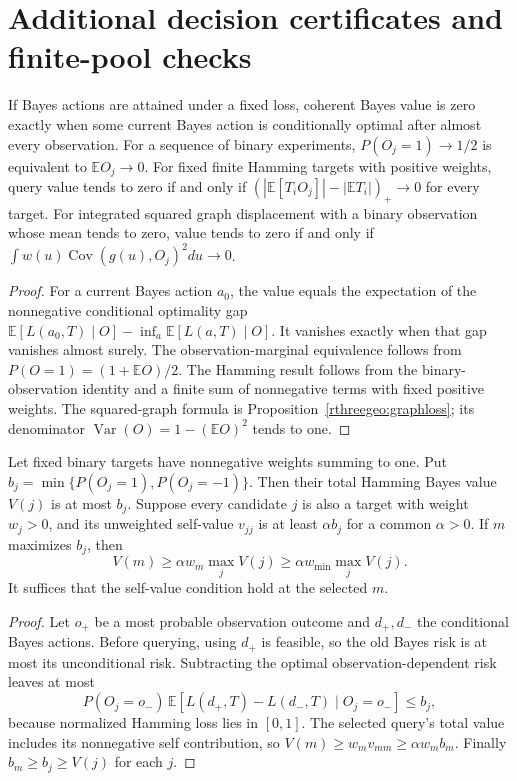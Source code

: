 \section{Additional decision certificates and finite-pool checks}

\begin{proposition}
\label{prop:zero-value-r3}
If Bayes actions are attained under a fixed loss, coherent Bayes value
is zero exactly when some current Bayes action is conditionally optimal
after almost every observation. For a sequence of binary experiments,
$P(O_j=1)\to1/2$ is equivalent to $\mathbb E O_j\to0$.
For fixed finite Hamming targets with positive weights, query value tends
to zero if and only if
$(|\mathbb E[T_iO_j]|-|\mathbb E T_i|)_+\to0$ for every target.
For integrated squared graph displacement with a binary observation
whose mean tends to zero, value tends to zero if and only if
$\int w(u)\operatorname{Cov}(g(u),O_j)^2du\to0$.
\end{proposition}
\begin{proof}
For a current Bayes action $a_0$, the value equals the expectation of
the nonnegative conditional optimality gap
$\mathbb E[L(a_0,T)\mid O]-\inf_a\mathbb E[L(a,T)\mid O]$.
It vanishes exactly when that gap vanishes almost surely.
The observation-marginal equivalence follows from
$P(O=1)=(1+\mathbb E O)/2$. The Hamming result follows from the
binary-observation identity and a finite sum of nonnegative terms
with fixed positive weights. The squared-graph formula is
Proposition~\ref{rthreegeo:graphloss}; its denominator
$\operatorname{Var}(O)=1-(\mathbb E O)^2$ tends to one.
\end{proof}

\begin{proposition}
\label{prop:self-margin-r3}
Let fixed binary targets have nonnegative weights summing to one. Put
$b_j=\min\{P(O_j=1),P(O_j=-1)\}$. Then their total Hamming Bayes
value $V(j)$ is at most $b_j$. Suppose every candidate $j$ is also a target
with weight $w_j>0$, and its unweighted self-value $v_{jj}$ is at least
$\alpha b_j$ for a common $\alpha>0$. If $m$ maximizes $b_j$, then
\[
 V(m)\ge \alpha w_m\max_j V(j)\ge\alpha w_{\min}\max_j V(j).
\]
It suffices that the self-value condition hold at the selected $m$.
\end{proposition}
\begin{proof}
Let $o_+$ be a most probable observation outcome and $d_+,d_-$ the
conditional Bayes actions. Before querying, using $d_+$ is feasible,
so the old Bayes risk is at most its unconditional risk. Subtracting the
optimal observation-dependent risk leaves at most
\[
 P(O_j=o_-)\,
 \mathbb E[L(d_+,T)-L(d_-,T)\mid O_j=o_-]\le b_j,
\]
because normalized Hamming loss lies in $[0,1]$.
The selected query's total value includes its nonnegative self contribution,
so $V(m)\ge w_m v_{mm}\ge\alpha w_m b_m$. Finally
$b_m\ge b_j\ge V(j)$ for each $j$.
\end{proof}

